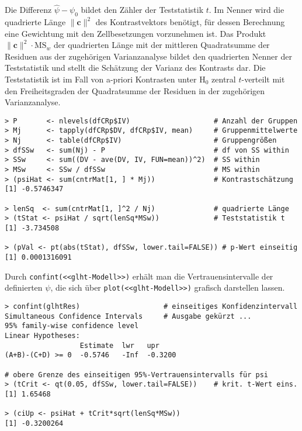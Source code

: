 Die Differenz $\hat{\psi} - \psi_{0}$ bildet den Zähler der Teststatistik $t$. Im Nenner wird die quadrierte Länge $\|\bm{c}\|^{2}$ des Kontrastvektors benötigt, für dessen Berechnung eine Gewichtung mit den Zellbesetzungen vorzunehmen ist. Das Produkt $\|\bm{c}\|^{2} \cdot \text{MS}_{w}$ der quadrierten Länge mit der mittleren Quadratsumme der Residuen aus der zugehörigen Varianzanalyse bildet den quadrierten Nenner der Teststatistik und stellt die Schätzung der Varianz des Kontrasts dar. Die Teststatistik ist im Fall von a-priori Kontrasten unter $\text{H}_{0}$ zentral $t$-verteilt mit den Freiheitsgraden der Quadratsumme der Residuen in der zugehörigen Varianzanalyse.
\begin{lstlisting}
> P       <- nlevels(dfCRp$IV)                    # Anzahl der Gruppen
> Mj      <- tapply(dfCRp$DV, dfCRp$IV, mean)     # Gruppenmittelwerte
> Nj      <- table(dfCRp$IV)                      # Gruppengrößen
> dfSSw   <- sum(Nj) - P                          # df von SS within
> SSw     <- sum((DV - ave(DV, IV, FUN=mean))^2)  # SS within
> MSw     <- SSw / dfSSw                          # MS within
> (psiHat <- sum(cntrMat[1, ] * Mj))              # Kontrastschätzung
[1] -0.5746347

> lenSq  <- sum(cntrMat[1, ]^2 / Nj)              # quadrierte Länge
> (tStat <- psiHat / sqrt(lenSq*MSw))             # Teststatistik t
[1] -3.734508

> (pVal <- pt(abs(tStat), dfSSw, lower.tail=FALSE)) # p-Wert einseitig
[1] 0.0001316091
\end{lstlisting}

Durch \lstinline!confint(<<glht-Modell>>)! erhält man die Vertrauensintervalle der definierten $\psi$, die sich über \lstinline!plot(<<glht-Modell>>)! grafisch darstellen lassen.
\begin{lstlisting}
> confint(glhtRes)                    # einseitiges Konfidenzintervall
Simultaneous Confidence Intervals     # Ausgabe gekürzt ...
95% family-wise confidence level
Linear Hypotheses:
                  Estimate  lwr   upr    
(A+B)-(C+D) >= 0  -0.5746   -Inf  -0.3200

# obere Grenze des einseitigen 95%-Vertrauensintervalls für psi
> (tCrit <- qt(0.05, dfSSw, lower.tail=FALSE))    # krit. t-Wert eins.
[1] 1.65468

> (ciUp <- psiHat + tCrit*sqrt(lenSq*MSw))
[1] -0.3200264
\end{lstlisting}

